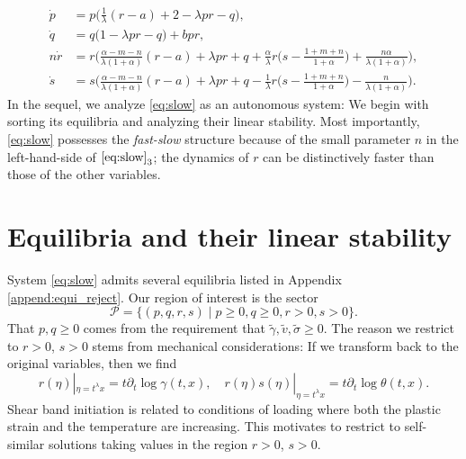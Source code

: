 \documentclass[usletter,11pt]{article}
\def\tg{{\tilde{\gamma}}}
\def\tv{{\tilde{v}}}
\def\ts{{\tilde{\sigma}}}
\theoremstyle{remark}
\begin{document}
\begin{equation}\label{eq:slow} \tag{S}
 \begin{aligned}
 \dot{p} &=p\Big(\frac{1}{\lambda}(r-a) + 2- \lambda p r -q\Big),\\
 \dot{q} &=q\Big(1 -\lambda p r -q\Big) + b p r,\\
 n\dot{r} &=r\Big(\frac{\alpha-m-n}{\lambda(1+\alpha)}(r-a) + \lambda pr + q +\frac{\alpha}{\lambda}r\big(s- \frac{1+m+n}{1+\alpha}\big) + \frac{n\alpha}{\lambda(1+\alpha)}\Big),\\
 \dot{s} &=s\Big(\frac{\alpha-m-n}{\lambda(1+\alpha)}(r-a) + \lambda pr + q - \frac{1}{\lambda}r\big(s- \frac{1+m+n}{1+\alpha}\big) - \frac{n}{\lambda(1+\alpha)}\Big).
 \end{aligned}
\end{equation}
In the sequel, we analyze \eqref{eq:slow} as an autonomous system: We begin with sorting its equilibria and analyzing their linear stability. Most importantly, \eqref{eq:slow} possesses the {\it fast-slow} structure because of the small parameter $n$ in the left-hand-side of $\eqref{eq:slow}_3$; the dynamics of $r$ can be distinctively faster than those of the other variables.




\section{Equilibria and their linear stability} \label{sec:equil}

System \eqref{eq:slow} admits several equilibria listed in Appendix \ref{append:equi_reject}. 
Our region of interest is the sector 
$$
\mathcal{P} = \{(p,q,r,s) \; | \; p\ge0, q\ge0, r>0, s>0 \}.
$$ 
That $p,q\ge0$ comes from the requirement that $\tg,\tv,\ts\ge0$. The reason we restrict to $r > 0$, $s > 0$
stems from mechanical considerations: If we transform back to the original variables, then we find
\begin{equation*}
 r(\eta)|_{\eta=t^\lambda x}=t\partial_t\log \gamma(t,x), \quad r(\eta)s(\eta)|_{\eta=t^\lambda x}=t\partial_t \log \theta(t,x).
\end{equation*}
Shear band initiation is related to conditions of loading where both the plastic strain and the temperature are increasing. This motivates to restrict to self-similar solutions
taking values in the region $r > 0$, $s > 0$. 
\end{document}
